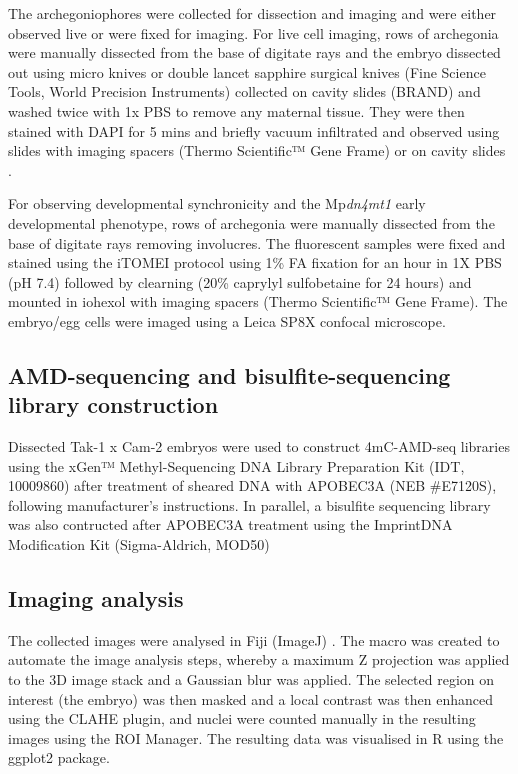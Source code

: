 The archegoniophores were collected for dissection and imaging and were either observed live or were fixed for imaging. For live cell imaging, rows of archegonia were manually dissected from the base of digitate rays and the embryo dissected out using micro knives or double lancet sapphire surgical knives (Fine Science Tools, World Precision Instruments) collected on cavity slides (BRAND\textregistered) and washed twice with 1x PBS to remove any maternal tissue. They were then stained with DAPI for 5 mins and briefly vacuum infiltrated and observed using slides with imaging spacers (Thermo Scientific™ Gene Frame) or on cavity slides \citep{RN139}. 

For observing developmental synchronicity and the Mp\textit{dn4mt1} early developmental phenotype,  rows of archegonia were manually dissected from the base of digitate rays removing involucres. The fluorescent samples were fixed and stained using the iTOMEI protocol \citep{RN148} using 1\% FA fixation for an hour in 1X PBS (pH 7.4) followed by clearning (20\% caprylyl sulfobetaine for 24 hours) and mounted in iohexol with imaging spacers (Thermo Scientific™ Gene Frame). The embryo/egg cells were imaged using a Leica SP8X confocal microscope.

\subsection{AMD-sequencing and bisulfite-sequencing library construction}

Dissected Tak-1 x Cam-2 embryos were used to construct 4mC-AMD-seq libraries using the xGen™ Methyl-Sequencing DNA Library Preparation Kit (IDT, 10009860) after treatment of sheared DNA with APOBEC3A (NEB \#E7120S), following manufacturer’s instructions. In parallel, a bisulfite sequencing library was also contructed after APOBEC3A treatment using the Imprint\textregistered DNA Modification Kit (Sigma-Aldrich, MOD50)


\subsection{Imaging analysis}

The collected images were analysed in Fiji (ImageJ) \citep{RN266}. The macro was created to automate the image analysis steps, whereby a maximum Z projection was applied to the 3D image stack and a Gaussian blur was applied. The selected region on interest (the embryo) was then masked and a local contrast was then enhanced using the CLAHE plugin, and nuclei were counted manually in the resulting images using the ROI Manager. The resulting data was visualised in R using the ggplot2 package.

